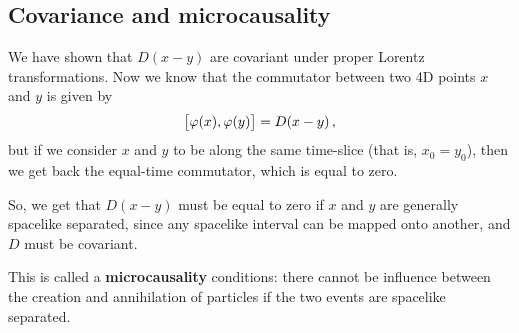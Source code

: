 \documentclass[main.tex]{subfiles}
\begin{document}
\subsection{Covariance and microcausality}

We have shown that \(D(x-y)\) are covariant under proper Lorentz transformations. Now we know that the commutator between two 4D points \(x\) and \(y\) is given by 
%
\begin{align}
\qty[\varphi (x), \varphi (y)] = D(x-y)
\,,
\end{align}
%
but if we consider \(x\) and \(y\) to be along the same time-slice (that is, \(x_0 = y_0 \)), then we get back the equal-time commutator, which is equal to zero. 

So, we get that \(D(x-y)\) must be equal to zero if \(x\) and \(y\) are generally spacelike separated, since any spacelike interval can be mapped onto another, and \(D\) must be covariant. 

This is called a \textbf{microcausality} conditions: there cannot be influence between the creation and annihilation of particles if the two events are spacelike separated. 
\end{document}
